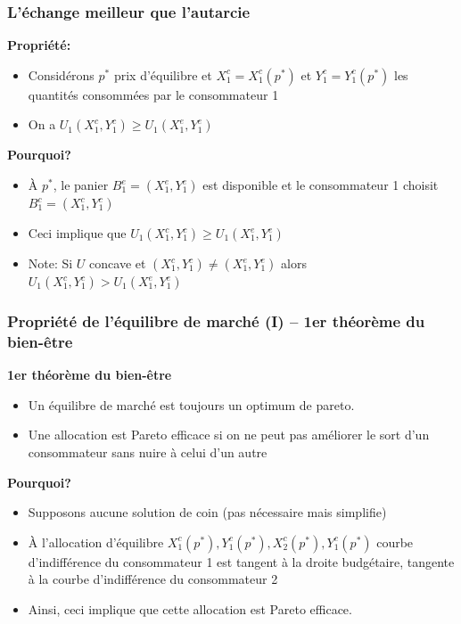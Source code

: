 \documentclass[handout]{beamer}
\newenvironment{iPar}[1]{\textbf{#1} \begin{itemize}}{\end{itemize}}
\newcommand{\mdp}{\medskip \pause}
\begin{document}
\begin{frame}\frametitle{L'échange meilleur que l'autarcie}

\begin{iPar}{Propriété:} \item Considérons $p^*$  prix d'équilibre et
$X^c_1 = X^c_1(p^*)$ et $Y^c_1 = Y^c_1(p^*)$ les quantités consommées par le consommateur 1\item On a $U_1(X^c_1, Y^c_1) \geq U_1(X^e_1, Y^e_1)$
\end{iPar}\mdp

\begin{iPar}{Pourquoi?} \item À $p^*$, le panier $B^e_1 = (X^e_1,Y^e_1)$ est disponible et le consommateur 1 choisit $B^c_1=(X^c_1, Y^c_1)$ \item Ceci implique que $U_1(X^c_1, Y^c_1) \geq U_1(X^e_1, Y^e_1)$
\pause \item Note: Si $U$ concave et $(X^c_1, Y^c_1) \neq (X^e_1,
Y^e_1)$ alors $U_1(X^c_1, Y^c_1) > U_1(X^e_1, Y^e_1)$ \end{iPar}

\end{frame}

\begin{frame}\frametitle{Propriété de l'équilibre de marché (I) -- 1er théorème du bien-être} \begin{iPar}{1er théorème du bien-être} \item  Un équilibre de marché est toujours un optimum de pareto. \item 
Une allocation est Pareto efficace si on ne peut pas améliorer le sort d'un consommateur sans nuire à celui d'un autre \end{iPar}\mdp



\begin{iPar}{Pourquoi?} \item<1-> Supposons aucune solution de coin (pas nécessaire mais simplifie) \item<2-> À l'allocation d'équilibre
$X^c_1(p^*),Y^c_1(p^*),X^c_2(p^*),Y^c_1(p^*)$ courbe d'indifférence du
consommateur 1 est tangent à la droite budgétaire, tangente à la courbe d'indifférence du consommateur 2 \item<3-> Ainsi, ceci implique que cette allocation est Pareto efficace.\end{iPar}

\end{frame}
\end{document}
